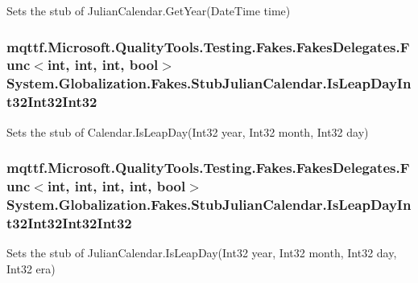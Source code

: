 Sets the stub of Julian\-Calendar.\-Get\-Year(\-Date\-Time time)

\hypertarget{class_system_1_1_globalization_1_1_fakes_1_1_stub_julian_calendar_a754be12d9cc63eea9c6232767b0d8f18}{
\subsubsection[{Is\-Leap\-Day\-Int32\-Int32\-Int32}]{\setlength{\rightskip}{0pt plus 5cm}mqttf.\-Microsoft.\-Quality\-Tools.\-Testing.\-Fakes.\-Fakes\-Delegates.\-Func$<$int, int, int, bool$>$ System.\-Globalization.\-Fakes.\-Stub\-Julian\-Calendar.\-Is\-Leap\-Day\-Int32\-Int32\-Int32}}\label{class_system_1_1_globalization_1_1_fakes_1_1_stub_julian_calendar_a754be12d9cc63eea9c6232767b0d8f18}


Sets the stub of Calendar.\-Is\-Leap\-Day(\-Int32 year, Int32 month, Int32 day)

\hypertarget{class_system_1_1_globalization_1_1_fakes_1_1_stub_julian_calendar_a5d66c62a44ade3e45eb841d50fa1232b}{
\subsubsection[{Is\-Leap\-Day\-Int32\-Int32\-Int32\-Int32}]{\setlength{\rightskip}{0pt plus 5cm}mqttf.\-Microsoft.\-Quality\-Tools.\-Testing.\-Fakes.\-Fakes\-Delegates.\-Func$<$int, int, int, int, bool$>$ System.\-Globalization.\-Fakes.\-Stub\-Julian\-Calendar.\-Is\-Leap\-Day\-Int32\-Int32\-Int32\-Int32}}\label{class_system_1_1_globalization_1_1_fakes_1_1_stub_julian_calendar_a5d66c62a44ade3e45eb841d50fa1232b}


Sets the stub of Julian\-Calendar.\-Is\-Leap\-Day(\-Int32 year, Int32 month, Int32 day, Int32 era)

